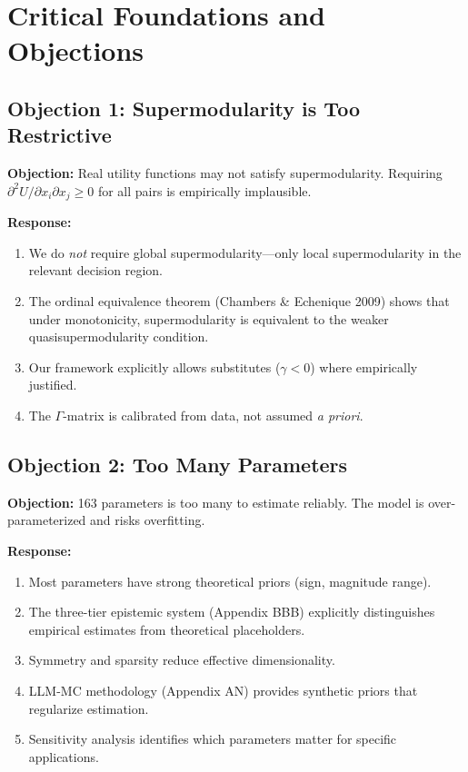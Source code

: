 
\section{Critical Foundations and Objections}
\label{sec:B-foundations-objections}

\subsection{Objection 1: Supermodularity is Too Restrictive}

\textbf{Objection:} Real utility functions may not satisfy supermodularity. 
Requiring $\partial^2 U / \partial x_i \partial x_j \geq 0$ for all pairs 
is empirically implausible.

\textbf{Response:} 
\begin{enumerate}[nosep]
    \item We do \textit{not} require global supermodularity---only local 
    supermodularity in the relevant decision region.
    \item The ordinal equivalence theorem (Chambers \& Echenique 2009) shows 
    that under monotonicity, supermodularity is equivalent to the weaker 
    quasisupermodularity condition.
    \item Our framework explicitly allows substitutes ($\gamma < 0$) where 
    empirically justified.
    \item The $\Gamma$-matrix is calibrated from data, not assumed 
    \textit{a priori}.
\end{enumerate}

\subsection{Objection 2: Too Many Parameters}

\textbf{Objection:} 163 parameters is too many to estimate reliably. The model 
is over-parameterized and risks overfitting.

\textbf{Response:}
\begin{enumerate}[nosep]
    \item Most parameters have strong theoretical priors (sign, magnitude range).
    \item The three-tier epistemic system (Appendix BBB) explicitly distinguishes 
    empirical estimates from theoretical placeholders.
    \item Symmetry and sparsity reduce effective dimensionality.
    \item LLM-MC methodology (Appendix AN) provides synthetic priors that 
    regularize estimation.
    \item Sensitivity analysis identifies which parameters matter for 
    specific applications.
\end{enumerate}

